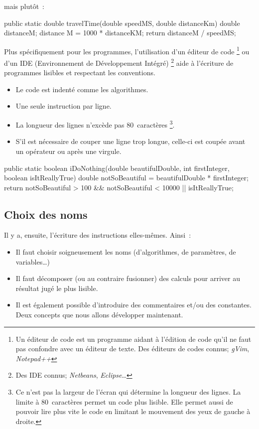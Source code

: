 			mais plutôt~:

			\begin{java}
public static double travelTime(double speedMS, double distanceKm) {
	double distanceM;
	distance M = 1000 * distanceKM;
	return distanceM / speedMS;
}
			\end{java}

			\medskip
	
			Plus spécifiquement pour les programmes, l'utilisation d'un éditeur 
			de code%
			\footnote{%
				Un éditeur de code est un programme aidant à l'édition de code
				qu'il ne faut pas confondre avec un éditeur de texte. Des
				éditeurs de codes connus; \textit{gVim}, \textit{Notepad++}
			} ou d'un IDE (Environnement de Développement Intégré)%
			\footnote{
				Des IDE connus; \textit{Netbeans}, \textit{Eclipse}…
			}
			aide à l'écriture de programmes lisibles et respectant les
			conventions. 
		
			\begin{itemize}
				\item Le code est indenté comme les algorithmes.
				\item Une seule instruction par ligne.
				\item La longueur des lignes n'excède pas 80 caractères%
					\footnote{
						Ce n'est pas la largeur de l'écran qui détermine la 
						longueur des lignes. La limite à 80 caractères permet 
						un code plus lisible. Elle permet aussi de pouvoir lire
						plus vite le code en limitant le mouvement des yeux de 
						gauche à droite. 
					}.
				\item S'il est nécessaire de couper une ligne trop longue, 
					celle-ci est coupée avant un opérateur ou après une virgule.
			\end{itemize}

			\begin{java}
public static boolean iDoNothing(double beautifulDouble, 
		int firstInteger, boolean isItReallyTrue){
	double notSoBeautiful = beautifulDouble * firstInteger; 
	return notSoBeautiful > 100 && notSoBeautiful < 10000
		|| isItReallyTrue;
}
			\end{java}


		\subsection{Choix des noms}
			
			Il y a, ensuite, l’écriture des instructions elles-mêmes.
			Ainsi~:
			\begin{itemize}
			\item
				Il faut choisir soigneusement les noms 
				(d’algorithmes, de paramètres, de variables\dots)
			\item
				Il faut décomposer (ou au contraire fusionner)
				des calculs pour arriver au résultat jugé
				le plus lisible.
			\item 
				Il est également possible d'introduire des commentaires et/ou
				des constantes. Deux concepts que nous allons développer 
				maintenant.
			\end{itemize}
			
